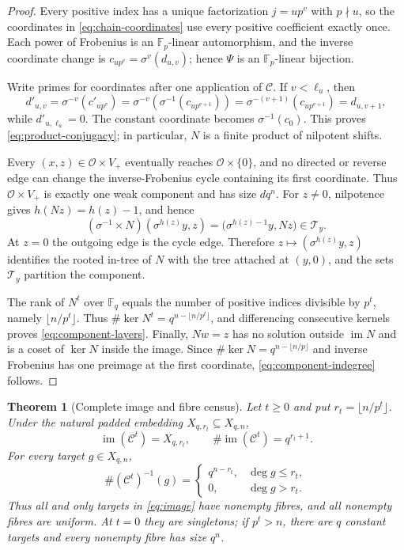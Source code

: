 \documentclass[10pt,a4paper]{amsart}
\newtheorem{theorem}{Theorem}[section]
\theoremstyle{definition}
\theoremstyle{remark}
\newcommand{\F}{\mathbb F}
\newcommand{\im}{\operatorname{im}}
\begin{document}
\begin{proof}
Every positive index has a unique factorization $j=up^v$ with $p\nmid u$,
so the coordinates in \eqref{eq:chain-coordinates} use every positive
coefficient exactly once.  Each power of Frobenius is an $\F_p$-linear
automorphism, and the inverse coordinate change is
$c_{up^v}=\sigma^v(d_{u,v})$; hence $\Psi$ is an $\F_p$-linear bijection.

Write primes for coordinates after one application of $\mathcal C$.  If
$v<\ell_u$, then
\[
 d'_{u,v}
 =\sigma^{-v}(c'_{up^v})
 =\sigma^{-v}\!\left(\sigma^{-1}(c_{up^{v+1}})\right)
 =\sigma^{-(v+1)}(c_{up^{v+1}})=d_{u,v+1},
\]
while $d'_{u,\ell_u}=0$.  The constant coordinate becomes
$\sigma^{-1}(c_0)$.  This proves \eqref{eq:product-conjugacy}; in
particular, $N$ is a finite product of nilpotent shifts.

Every $(x,z)\in\mathcal O\times V_+$ eventually reaches
$\mathcal O\times\{0\}$, and no directed or reverse edge can change the
inverse-Frobenius cycle containing its first coordinate.  Thus
$\mathcal O\times V_+$ is exactly one weak component and has size $dq^n$.
For $z\ne0$, nilpotence gives $h(Nz)=h(z)-1$, and hence
\[
 (\sigma^{-1}\times N)(\sigma^{h(z)}y,z)
 =\bigl(\sigma^{h(z)-1}y,Nz\bigr)\in\mathcal T_y.
\]
At $z=0$ the outgoing edge is the cycle edge.  Therefore
$z\mapsto(\sigma^{h(z)}y,z)$ identifies the rooted in-tree of $N$ with
the tree attached at $(y,0)$, and the sets $\mathcal T_y$ partition the
component.

The rank of $N^t$ over $\F_q$ equals the number of positive indices
divisible by $p^t$, namely $\lfloor n/p^t\rfloor$.  Thus
$\#\ker N^t=q^{n-\lfloor n/p^t\rfloor}$, and differencing consecutive
kernels proves \eqref{eq:component-layers}.  Finally, $Nw=z$ has no
solution outside $\im N$ and is a coset of $\ker N$ inside the image.
Since $\#\ker N=q^{n-\lfloor n/p\rfloor}$ and inverse Frobenius has one
preimage at the first coordinate, \eqref{eq:component-indegree} follows.
\end{proof}

\begin{theorem}[Complete image and fibre census]
\label{thm:fibres}
Let $t\ge0$ and put $r_t=\lfloor n/p^t\rfloor$.  Under the natural padded
embedding $X_{q,r_t}\subseteq X_{q,n}$,
\begin{equation}
 \im(\mathcal C^t)=X_{q,r_t},
 \qquad
 \#\im(\mathcal C^t)=q^{r_t+1}.
 \label{eq:image}
\end{equation}
For every target $g\in X_{q,n}$,
\begin{equation}
 \boxed{\quad
 \#(\mathcal C^t)^{-1}(g)=
 \begin{cases}
 q^{n-r_t},&\deg g\le r_t,\\
 0,&\deg g>r_t.
 \end{cases}
 \quad}
 \label{eq:fibres}
\end{equation}
Thus all and only targets in \eqref{eq:image} have nonempty fibres, and all
nonempty fibres are uniform.  At $t=0$ they are singletons; if $p^t>n$,
there are $q$ constant targets and every nonempty fibre has size $q^n$.
\end{theorem}
\end{document}
